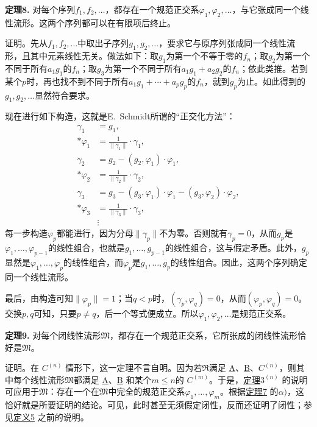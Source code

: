 \documentclass[fontsize=13pt,twoside,openany,headings=normal,parskip=false,bookmarkpackage=false,DIV=calc]{scrbook}
\newcommand{\textkaishu}[1]{{\zhkaishu #1}}
\begin{document}
\leavevmode{}\textbf{定理8.}\label{thm:II.8} 对每个序列$f_1,\allowbreak f_2,\allowbreak \ldots$，都存在一个规范正交系$\varphi_1,\allowbreak \varphi_2,\allowbreak \ldots$，与它张成同一个线性流形。这两个序列都可以在有限项后终止。

\textkaishu{证明。}先从$f_1,\allowbreak f_2,\allowbreak \ldots$中取出子序列$g_1,\allowbreak g_2,\allowbreak \ldots$，要求它与原序列张成同一个线性流形，且其中元素线性无关。做法如下：取$g_1$为第一个不等于零的$f_n$；取$g_2$为第一个不同于所有$a_1g_1$的$f_n$；取$g_3$为第一个不同于所有$a_1g_1+a_2g_2$的$f_n$；依此类推。若到某个$p$时，再也找不到不同于所有$a_1g_1+\cdots+a_pg_p$的$f_n$，就到$g_p$为止。如此得到的$g_1,\allowbreak g_2,\allowbreak \ldots$显然符合要求。

现在进行如下构造，这就是E.~Schmidt所谓的“正交化方法”：
\begin{align*}
\gamma_1&=g_1,\\*
\varphi_1&=\frac1{\|\gamma_1\|}\cdot\gamma_1,\\
\gamma_2&=g_2-(g_2,\varphi_1)\cdot\varphi_1,\\*
\varphi_2&=\frac1{\|\gamma_2\|}\cdot\gamma_2,\\
\gamma_3&=g_3-(g_3,\varphi_1)\cdot\varphi_1-(g_3,\varphi_2)\cdot\varphi_2,\\*
\varphi_3&=\frac1{\|\gamma_3\|}\cdot\gamma_3,\\
&\vdots
\end{align*}
每一步构造$\varphi_p$都能进行，因为分母$\|\gamma_p\|$不为零。否则就有$\gamma_p=0$，从而$g_p$是$\varphi_1,\allowbreak \ldots,\allowbreak \varphi_{p-1}$的线性组合，也就是$g_1,\allowbreak \ldots,\allowbreak g_{p-1}$的线性组合，这与假定矛盾。此外，$g_p$显然是$\varphi_1,\allowbreak \ldots,\allowbreak \varphi_p$的线性组合，而$\varphi_p$是$g_1,\allowbreak \ldots,\allowbreak g_p$的线性组合。因此，这两个序列确定同一个线性流形。

最后，由构造可知$\|\varphi_p\|=1$；当$q<p$时，$(\gamma_p,\allowbreak \varphi_q)=0$，从而$(\varphi_p,\allowbreak \varphi_q)=0$。交换$p,\allowbreak q$可知，只要$p\ne q$，后一个等式便成立。所以$\varphi_1,\allowbreak \varphi_2,\allowbreak \ldots$是规范正交系。

\leavevmode{}\textbf{定理9.}\label{thm:II.9} 对每个闭线性流形$\mathfrak{M}$，都存在一个规范正交系，它所张成的闭线性流形恰好是$\mathfrak{M}$。

\hypertarget{origpage-30}{}\label{origpage-30}\textkaishu{证明。}在 \hyperref[ax:II.Cn]{$C^{(n)}$} 情形下，这一定理不言自明。因为若$\mathfrak{R}$满足 \hyperref[ax:II.A]{A}、\hyperref[ax:II.B]{B}、\hyperref[ax:II.Cn]{$C^{(n)}$}，则其中每个线性流形$\mathfrak{M}$都满足 \hyperref[ax:II.A]{A}、\hyperref[ax:II.B]{B} 和某个$m\leq n$的 \hyperref[ax:II.Cn]{$C^{(m)}$}。于是，\CJKglue \hyperref[thm:II.3n]{定理$3^{(n)}$} 的说明可应用于$\mathfrak{M}$：存在一个在$\mathfrak{M}$中完全的规范正交系$\varphi_1,\allowbreak \ldots,\allowbreak \varphi_m$。根据\CJKglue \hyperref[thm:II.7]{定理7} 的$\alpha)$，这恰好就是所要证明的结论。可见，此时甚至无须假定闭性，反而还证明了闭性；参见\CJKglue \hyperref[def:II.5]{定义5} 之前的说明。
\end{document}
